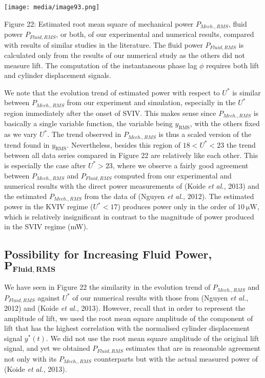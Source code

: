 \documentclass[]{article}
\begin{document}
\texttt{[image: media/image93.png]}

\protect\hypertarget{_Ref41049462}{}{}Figure 22: Estimated root mean
square of mechanical power \(P_{Mech.,RMS}\), fluid power
\(P_{Fluid,RMS}\), or both, of our experimental and numerical results,
compared with results of similar studies in the literature. The fluid
power \(P_{Fluid,RMS}\) is calculated only from the results of our
numerical study as the others did not measure lift. The computation of
the instantaneous phase lag \(\phi\) requires both lift and cylinder
displacement signals.

We note that the evolution trend of estimated power with respect to
\(U^{*}\) is similar between \(P_{Mech.,RMS}\) from our experiment and
simulation, especially in the \(U^{*}\) region immediately after the
onset of SVIV. This makes sense since \(P_{Mech.,RMS}\) is basically a
single variable function, the variable being \(y_{\text{RMS}}\), with
the others fixed as we vary \(U^{*}\). The trend observed in
\(P_{Mech.,RMS}\) is thus a scaled version of the trend found in
\(y_{\text{RMS}}\). Nevertheless, besides this region of
\(18 < U^{*} < 23\) the trend between all data series compared in Figure
22 are relatively like each other. This is especially the case after
\(U^{*} > 23\), where we observe a fairly good agreement between
\(P_{Mech.,RMS}\) and \(P_{Fluid,RMS}\) computed from our experimental
and numerical results with the direct power measurements of (Koide
\emph{et al.}, 2013) and the estimated \(P_{Mech.,RMS}\) from the data
of (Nguyen \emph{et al.}, 2012). The estimated power in the KVIV regime
(\(U^{*} < 17\)) produces power only in the order of \(10\ \text{μW}\),
which is relatively insignificant in contrast to the magnitude of power
produced in the SVIV regime (mW).

\subsection{\texorpdfstring{Possibility for Increasing Fluid Power,
\(\mathbf{P}_{\mathbf{Fluid,RMS}}\)}{Possibility for Increasing Fluid Power, \textbackslash{}mathbf\{P\}\_\{\textbackslash{}mathbf\{Fluid,RMS\}\}}}\label{possibility-for-increasing-fluid-power-mathbfp_mathbffluidrms}

We have seen in Figure 22 the similarity in the evolution trend of
\(P_{Mech.,RMS}\) and \(P_{Fluid,RMS}\) against \(U^{*}\) of our
numerical results with those from (Nguyen \emph{et al.}, 2012) and
(Koide \emph{et al.}, 2013). However, recall that in order to represent
the amplitude of lift, we used the root mean square amplitude of the
component of lift that has the highest correlation with the normalised
cylinder displacement signal \(y^{*}\left( t \right)\). We did not use
the root mean square amplitude of the original lift signal, and yet we
obtained \(P_{Fluid,RMS}\) estimates that are in reasonable agreement
not only with its \(P_{Mech.,RMS}\) counterparts but with the actual
measured power of (Koide \emph{et al.}, 2013).
\end{document}
